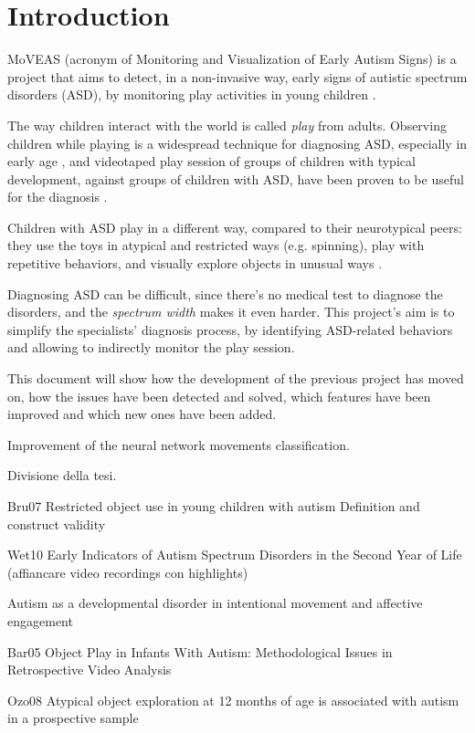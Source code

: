 \chapter{Introduction}
MoVEAS (acronym of Monitoring and Visualization of Early Autism Signs) is a project that aims to detect, in a non-invasive way, early signs of autistic spectrum disorders (ASD), by monitoring play activities in young children \cite{Bon20, Lan19}.
\bigbreak

The way children interact with the world is called \textit{play} from adults. Observing children while playing is a widespread technique for diagnosing ASD, especially in early age \cite{Ozo08}, and videotaped play session of groups of children with typical development, against groups of children with ASD, have been proven to be useful for the diagnosis \cite{Bar05, Ozo08, Wet10}.

Children with ASD play in a different way, compared to their neurotypical peers: they use the toys in atypical and restricted ways (e.g. spinning), play with repetitive behaviors, and visually explore objects in unusual ways \cite{Bru07, Ozo08}.
\bigbreak

Diagnosing ASD can be difficult, since there's no medical test to diagnose the disorders, and the \textit{spectrum width} makes it even harder. This project's aim is to simplify the specialists' diagnosis process, by identifying ASD-related behaviors and allowing to indirectly monitor the play session.
\bigbreak

This document will show how the development of the previous project has moved on, how the issues have been detected and solved, which features have been improved and which new ones have been added.

Improvement of the neural network movements classification.
\bigbreak

Divisione della tesi.


Bru07
Restricted object use in young children with autism Definition and construct validity

Wet10
Early Indicators of Autism Spectrum Disorders in the Second Year of Life (affiancare video recordings con highlights)

Autism as a developmental disorder in intentional movement and affective engagement

Bar05
Object Play in Infants With Autism: Methodological Issues in Retrospective Video Analysis

Ozo08
Atypical object exploration at 12 months of age is associated with autism in a prospective sample
